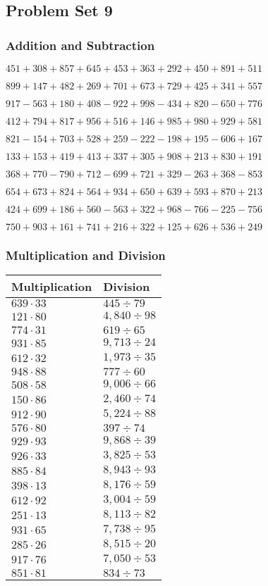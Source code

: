\hypertarget{problem-set-9-2}{%
\subsection{Problem Set 9}\label{problem-set-9-2}}

\hypertarget{addition-and-subtraction-109}{%
\subsubsection{Addition and
Subtraction}\label{addition-and-subtraction-109}}

\(451 + 308 + 857 + 645 + 453 + 363 + 292 + 450 + 891 + 511\)

\(899 + 147 + 482 + 269 + 701 + 673 + 729 + 425 + 341 + 557\)

\(917 - 563 + 180 + 408 - 922 + 998 - 434 + 820 - 650 + 776\)

\(412 + 794 + 817 + 956 + 516 + 146 + 985 + 980 + 929 + 581\)

\(821 - 154 + 703 + 528 + 259 - 222 - 198 + 195 - 606 + 167\)

\(133 + 153 + 419 + 413 + 337 + 305 + 908 + 213 + 830 + 191\)

\(368 + 770 - 790 + 712 - 699 + 721 + 329 - 263 + 368 - 853\)

\(654 + 673 + 824 + 564 + 934 + 650 + 639 + 593 + 870 + 213\)

\(424 + 699 + 186 + 560 - 563 + 322 + 968 - 766 - 225 - 756\)

\(750 + 903 + 161 + 741 + 216 + 322 + 125 + 626 + 536 + 249\)

\hypertarget{multiplication-and-division-109}{%
\subsubsection{Multiplication and
Division}\label{multiplication-and-division-109}}

\begin{longtable}[]{@{}ll@{}}
\toprule
Multiplication & Division\tabularnewline
\midrule
\endhead
\(639 \cdot 33\) & \(445÷79\)\tabularnewline
\(121 \cdot 80\) & \(4,840÷98\)\tabularnewline
\(774 \cdot 31\) & \(619÷65\)\tabularnewline
\(931 \cdot 85\) & \(9,713÷24\)\tabularnewline
\(612 \cdot 32\) & \(1,973÷35\)\tabularnewline
\(948 \cdot 88\) & \(777÷60\)\tabularnewline
\(508 \cdot 58\) & \(9,006÷66\)\tabularnewline
\(150 \cdot 86\) & \(2,460÷74\)\tabularnewline
\(912 \cdot 90\) & \(5,224÷88\)\tabularnewline
\(576 \cdot 80\) & \(397 ÷ 74\)\tabularnewline
\(929 \cdot 93\) & \(9,868÷39\)\tabularnewline
\(926 \cdot 33\) & \(3,825÷53\)\tabularnewline
\(885 \cdot 84\) & \(8,943÷93\)\tabularnewline
\(398 \cdot 13\) & \(8,176÷59\)\tabularnewline
\(612 \cdot 92\) & \(3,004÷59\)\tabularnewline
\(251 \cdot 13\) & \(8,113÷82\)\tabularnewline
\(931 \cdot 65\) & \(7,738÷95\)\tabularnewline
\(285 \cdot 26\) & \(8,515÷20\)\tabularnewline
\(917 \cdot 76\) & \(7,050÷53\)\tabularnewline
\(851 \cdot 81\) & \(834÷73\)\tabularnewline
\bottomrule
\end{longtable}

